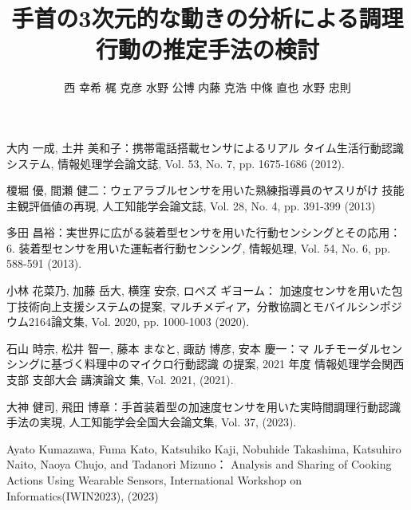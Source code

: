 \documentclass[a4j,8pt,twocolumn]{extarticle}
\title{手首の3次元的な動きの分析による調理行動の推定手法の検討}
\author{西 幸希\DAG{1} \qquad 梶 克彦\DAG{1} \qquad 水野 公博\DAG{2} \qquad 内藤 克浩\DAG{1} \qquad 中條 直也\DAG{1} \qquad 水野 忠則\DAG{1}}
\affiliation{\DAG{1}愛知工業大学情報科学部 \qquad \DAG{2}三菱電機エンジニアリング株式会社}
\begin{document}
	
\maketitle
\thispagestyle{empty}	%





\begin{thebibliography}{9}
大内 一成, 土井 美和子：携帯電話搭載センサによるリアル
タイム生活行動認識システム, 情報処理学会論文誌, Vol. 53,
No. 7, pp. 1675-1686 (2012).

榎堀 優, 間瀬 健二：ウェアラブルセンサを用いた熟練指導員のヤスリがけ
技能主観評価値の再現, 人工知能学会論文誌, Vol. 28, No. 4, pp. 391-399 (2013)

多田 昌裕：実世界に広がる装着型センサを用いた行動センシングとその応用：6. 装着型センサを用いた運転者行動センシング, 情報処理, Vol. 54, No. 6, pp. 588-591 (2013).

小林 花菜乃, 加藤 岳大, 横窪 安奈, ロペズ ギヨーム：
加速度センサを用いた包丁技術向上支援システムの提案, マルチメディア，分散協調とモバイルシンポジウム2164論文集, Vol. 2020, pp. 1000-1003 (2020).

石山 時宗, 松井 智一, 藤本 まなと, 諏訪 博彦, 安本 慶一：マ
ルチモーダルセンシングに基づく料理中のマイクロ行動認識
の提案, 2021 年度 情報処理学会関西支部 支部大会 講演論文
集, Vol. 2021, (2021).

大神 健司, 飛田 博章：手首装着型の加速度センサを用いた実時間調理行動認識手法の実現,
 人工知能学会全国大会論文集, Vol. 37, (2023).

Ayato Kumazawa, Fuma Kato, Katsuhiko Kaji, Nobuhide Takashima, Katsuhiro Naito, Naoya Chujo, and Tadanori Mizuno：
Analysis and Sharing of Cooking Actions Using Wearable Sensors, International Workshop on Informatics(IWIN2023), (2023)
 

\end{thebibliography}


\end{document}
